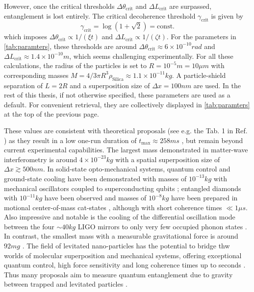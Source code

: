 However, once the critical thresholds $\Delta \theta_\mathrm{crit}$ and $\Delta L_\mathrm{crit}$ are surpassed, entanglement is lost entirely.
The critical decoherence threshold $\gamma_\mathrm{crit}$ is given by
\begin{equation}\label{eq:4:critical-point}
  \gamma_\mathrm{crit} = \log(1 + \sqrt{2}) = \mathrm{const.}
\end{equation}
which imposes $\Delta\theta_\mathrm{crit} \propto 1/(\xi t)$ and $\Delta L_\mathrm{crit} \propto 1/(\zeta t)$. 
For the parameters in \cref{tab:paramters}, these thresholds are around $\Delta \theta_\mathrm{crit} \approx 6 \times 10^{-10} \si{rad}$ and $\Delta L_\mathrm{crit} \approx 1.4 \times 10^{-10} \si{m}$, which seems challenging experimentally.
For all these calculations, the radius of the particles is set to $R=10^{-5}\si{m} = 10\si{\mu m}$ with corresponding masses $M=4/3 \pi R^3 \rho_\mathrm{Silica} \approx 1.1\times 10^{-11}\si{kg}$.
A particle-shield separation of $L=2R$ and a superposition size of $\Delta x = 100\si{nm}$ are used.
In the rest of this thesis, if not otherwise specified, these parameters are used as a default.
For convenient retrieval, they are collectively displayed in \cref{tab:paramters} at the top of the previous page.

These values are consistent with theoretical proposals (see e.g. the Tab. 1 in Ref. \cite{Rijavec_2021}) as they result in a low one-run duration of $t_\mathrm{max}\approx 258\si{ms}$ \cite[Timestamp: 51:00]{Aspelmeyer_2024}, but remain beyond current experimental capabilities.
The largest mass demonstrated in matter-wave interferometry is around $4\times 10^{-23}\si{kg}$ \cite{Fein_2019} with a spatial superposition size of $\Delta x \gtrsim 500\si{nm}$.
In solid-state opto-mechanical systems, quantum control and ground-state cooling have been demonstrated with masses of $10^{-13}\si{kg}$ with mechanical oscillators coupled to superconducting qubits \cite{OConnell_2010}; entangled diamonds with $10^{-11}\si{kg}$ have been observed \cite{Lee_2011} and masses of $10^{-8}\si{kg}$ have been prepared in motional center-of-mass cat-states \cite{Bild_2023}, although with short coherence times $\ll 1\si{\mu s}$.
Also impressive and notable is the cooling of the differential oscillation mode between the four $\sim 40\si{kg}$ LIGO mirrors to only very few occupied phonon states \cite{Whittle_2021}.
In contrast, the smallest mass with a measurable gravitational force is around $92 \si{mg}$ \cite{Westphal_2021}.
The field of levitated nano-particles has the potential to bridge thw worlds of molecular superposition and mechanical systems, offering exceptional quantum control, high force sensitivity and long coherence times up to seconds \cite{Aspelmeyer_2024}.
Thus many proposals aim to measure quantum entanglement due to gravity between trapped and levitated particles \cite{Krisnanda_2020,GonzalezBallestero_2021}.

